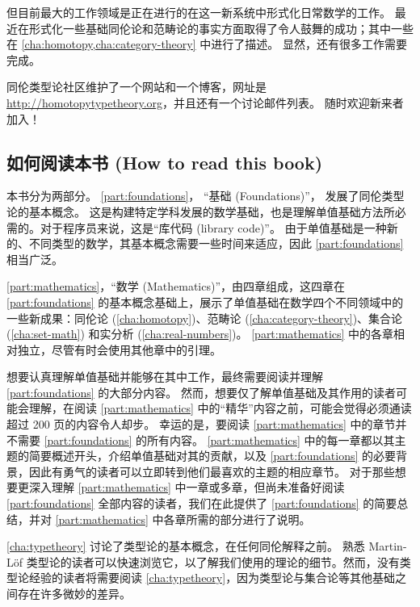 但目前最大的工作领域是正在进行的在这一新系统中形式化日常数学的工作。
最近在形式化一些基础同伦论和范畴论的事实方面取得了令人鼓舞的成功；其中一些在 \cref{cha:homotopy,cha:category-theory} 中进行了描述。
显然，还有很多工作需要完成。

%

同伦类型论社区维护了一个网站和一个博客，网址是 \url{http://homotopytypetheory.org}，并且还有一个讨论邮件列表。
随时欢迎新来者加入！

\subsection*{如何阅读本书 (How to read this book)}

本书分为两部分。
\cref{part:foundations}， “基础 (Foundations)”， 发展了同伦类型论的基本概念。
这是构建特定学科发展的数学基础，也是理解单值基础方法所必需的。对于程序员来说，这是“库代码 (library code)”。
由于单值基础是一种新的、不同类型的数学，其基本概念需要一些时间来适应，因此 \cref{part:foundations} 相当广泛。

\cref{part:mathematics}，“数学 (Mathematics)”，由四章组成，这四章在 \cref{part:foundations} 的基本概念基础上，展示了单值基础在数学四个不同领域中的一些新成果：同伦论 (\cref{cha:homotopy})、范畴论 (\cref{cha:category-theory})、集合论 (\cref{cha:set-math}) 和实分析 (\cref{cha:real-numbers})。
\cref{part:mathematics} 中的各章相对独立，尽管有时会使用其他章中的引理。

想要认真理解单值基础并能够在其中工作，最终需要阅读并理解 \cref{part:foundations} 的大部分内容。
然而，想要仅了解单值基础及其作用的读者可能会理解，在阅读 \cref{part:mathematics} 中的“精华”内容之前，可能会觉得必须通读超过 200 页的内容令人却步。
幸运的是，要阅读 \cref{part:mathematics} 中的章节并不需要 \cref{part:foundations} 的所有内容。
\cref{part:mathematics} 中的每一章都以其主题的简要概述开头，介绍单值基础对其的贡献，以及 \cref{part:foundations} 的必要背景，因此有勇气的读者可以立即转到他们最喜欢的主题的相应章节。
对于那些想要更深入理解 \cref{part:mathematics} 中一章或多章，但尚未准备好阅读 \cref{part:foundations} 全部内容的读者，我们在此提供了 \cref{part:foundations} 的简要总结，并对 \cref{part:mathematics} 中各章所需的部分进行了说明。

\cref{cha:typetheory} 讨论了类型论的基本概念，在任何同伦解释之前。
熟悉 Martin-L\"of 类型论的读者可以快速浏览它，以了解我们使用的理论的细节。然而，没有类型论经验的读者将需要阅读 \cref{cha:typetheory}，因为类型论与集合论等其他基础之间存在许多微妙的差异。

